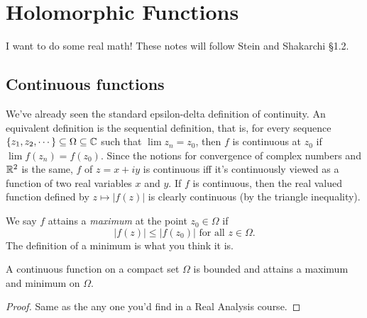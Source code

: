 \section{Holomorphic Functions}
I want to do some real math! These notes will follow Stein and Shakarchi \S 1.2.
\subsection{Continuous functions}
We've already seen the standard epsilon-delta definition of continuity. An equivalent definition is the sequential definition, that is, for every sequence $\{z_1,z_2,\cdots\} \subseteq \Omega \subseteq \mathbb{C}$ such that $\lim z_n=z_0$, then $f$ is continuous at $z_0$ if $\lim f(z_n)=f(z_0)$. Since the notions for convergence of complex numbers and $\mathbb{R}^2$ is the same, $f$ of $z=x+iy$ is continuous iff it's continuously viewed as a function of two real variables $x$ and $y$. If $f$ is continuous, then the real valued function defined by $z\mapsto |f(z)|$ is clearly continuous (by the triangle inequality).

We say $f$ attains a \emph{maximum} at the point $z_0\in \Omega$ if \[
    |f(z)|\leq |f(z_0)| \,\,\text{for all}\,\,  z\in \Omega.
\] The definition of a minimum is what you think it is.
\begin{theorem}
    A continuous function on a compact set $\Omega$ is bounded and attains a maximum and minimum on $\Omega$.
\end{theorem}
\begin{proof}
    Same as the any one you'd find in a Real Analysis course.
\end{proof}
